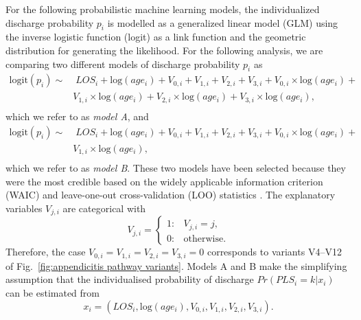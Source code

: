 For the following probabilistic machine learning models, the individualized discharge probability $p_i$ is modelled as a generalized linear model (GLM) using the inverse logistic function (logit) as a link function and the geometric distribution for generating the likelihood. 
For the following analysis, we are comparing two different models of
discharge probability $p_i$ as
\begin{equation}\label{modelA}
  \begin{split}
  \text{logit}(p_i) \sim & \;LOS_i + \text{log}(age_i) + 
                            V_{0,i} + V_{1,i} + V_{2,i} + V_{3,i} + V_{0,i}\times\text{log}(age_i) +\\
  &   V_{1,i}\times\text{log}(age_i) + V_{2,i}\times\text{log}(age_i) + V_{3,i}\times\text{log}(age_i),\\
  \end{split}
\end{equation}
which we refer to as \textit{model A}, and
\begin{equation}\label{modelB}
  \begin{split}
  \text{logit}(p_i) \sim & \;LOS_i + \text{log}(age_i) +
                                                         V_{0,i} + V_{1,i} + V_{2,i} + V_{3,i} + V_{0,i}\times\text{log}(age_i) +\\
  &    V_{1,i}\times\text{log}(age_i),\\
  \end{split}
\end{equation}
which we refer to as \textit{model B}.
These two models have been selected because they were the most
credible based on the widely applicable information criterion
(WAIC) and leave-one-out cross-validation (LOO) statistics
\cite{Vehtari2017_WAIC_LOO}.
The explanatory variables $V_{j,i}$ are categorical with 
\begin{equation}
V_{j,i} = \begin{cases}
	1: & V_{j,i} = j,\\
        0: & \text{otherwise}.
\end{cases}
\end{equation}
Therefore, the case $V_{0,i}=V_{1,i}=V_{2,i}=V_{3,i}=0$ corresponds to variants V4--V12 of Fig.~\ref{fig:appendicitis pathway variants}.
Models A and B make the simplifying assumption that the individualised
probability of discharge $Pr(PLS_i=k|x_i)$ can be estimated from 
\begin{equation}
x_i = (LOS_i, \text{log}(age_i), V_{0,i}, V_{1, i}, V_{2, i}, V_{3, i}).
\end{equation}
